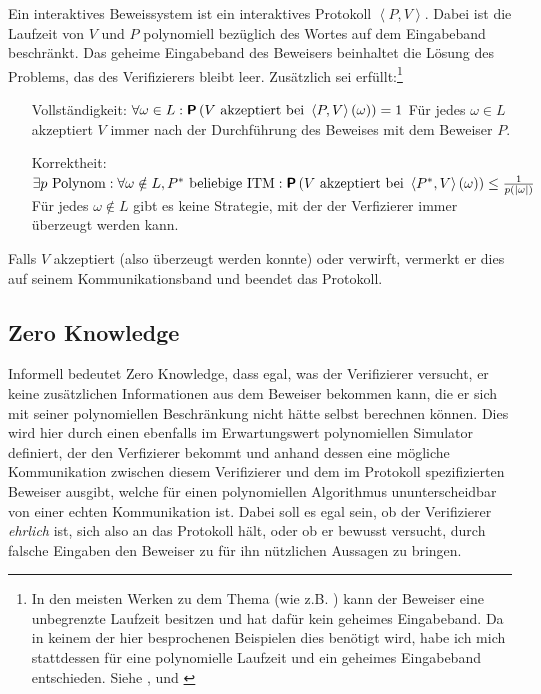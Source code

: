 \begin{definition}
\label{definition:proofsystem}
Ein interaktives Beweissystem ist ein interaktives Protokoll 
\( \left< P, V\right> \). Dabei ist die Laufzeit von \( V \) und \( P \) polynomiell bezüglich des Wortes auf dem Eingabeband beschränkt. Das geheime Eingabeband des Beweisers beinhaltet die Lösung des Problems, das des Verifizierers bleibt leer. Zusätzlich sei erfüllt:\footnote{In den meisten Werken zu dem Thema (wie z.B. \cite{np}) kann der Beweiser eine unbegrenzte Laufzeit besitzen und hat dafür kein geheimes Eingabeband. Da in keinem der hier besprochenen Beispielen dies benötigt wird, habe ich mich stattdessen für eine polynomielle Laufzeit und ein geheimes Eingabeband entschieden. Siehe \cite[Chapter 2]{identity}, \cite[Definition 1]{20yearszeroknowledge} und \cite[Definition 2]{np}}
\begin{itemize}

\item[\textnormal{Vollständigkeit:}] \( \forall \omega \in L : \textnormal{\textbf{\textsf{P}}} \left( V \textnormal{ akzeptiert bei } \left< P, V \right> \left( \omega \right) \right) = 1 \)  \glqq{}Für jedes \( \omega \in L \) akzeptiert \( V \) immer nach der Durchführung des Beweises mit dem Beweiser \( P \).\grqq{}

\item[\textnormal{Korrektheit:}] \( \exists p \textnormal{ Polynom}: \forall \omega \notin L, P^{\ast} \textnormal{ beliebige ITM} : \textnormal{\textbf{\textsf{P}}} \left( V \textnormal{ akzeptiert bei } \left< P ^{\ast}, V \right> \left( \omega \right) \right) \leq \frac{1}{p \left( \left| \omega \right| \right)}  \) \glqq{}Für jedes \( \omega \notin L \) gibt es keine Strategie, mit der der Verfizierer \glqq{}immer\grqq{} überzeugt werden kann.\grqq{}
\end{itemize}
\end{definition}

 Falls \( V \) akzeptiert (also überzeugt werden konnte) oder verwirft, vermerkt er dies auf seinem Kommunikationsband und beendet das Protokoll.

\subsection{Zero Knowledge}
Informell bedeutet Zero Knowledge, dass egal, was der Verifizierer versucht, er keine zusätzlichen Informationen aus dem Beweiser bekommen kann, die er sich mit seiner polynomiellen Beschränkung nicht hätte selbst berechnen können. Dies wird hier durch einen ebenfalls im Erwartungswert polynomiellen Simulator definiert, der den Verfizierer bekommt und anhand dessen eine mögliche Kommunikation zwischen diesem Verifizierer und dem im Protokoll spezifizierten Beweiser ausgibt, welche für einen polynomiellen Algorithmus ununterscheidbar von einer echten Kommunikation ist. Dabei soll es egal sein, ob der Verifizierer \textit{ehrlich} ist, sich also an das Protokoll hält, oder ob er bewusst versucht, durch falsche Eingaben den Beweiser zu für ihn nützlichen Aussagen zu bringen.

